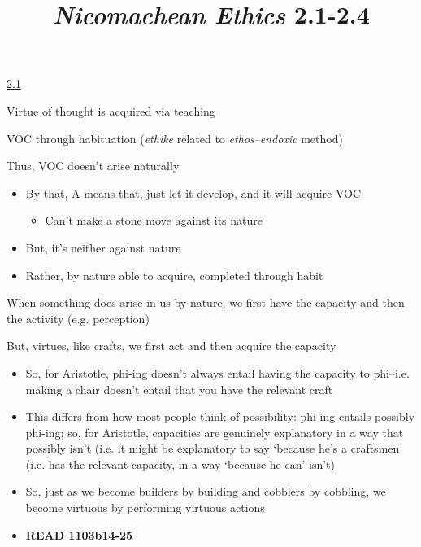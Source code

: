 \documentclass[11pt]{article}
\title{\emph{Nicomachean Ethics} 2.1-2.4}
\author{}
\date{}
\begin{document}
\maketitle

\noindent\underline{2.1}
\vspace*{2mm}

\noindent Virtue of thought is acquired via teaching
\vspace*{2mm}

\noindent VOC through habituation (\emph{ethike} related to \emph{ethos}--\emph{endoxic} method)
\vspace*{2mm}

\noindent Thus, VOC doesn't arise naturally

\begin{itemize}\item{By that, A means that, just let it develop, and it will acquire VOC}\begin{itemize}\item{Can't make a stone move against its nature}\end{itemize}\item{But, it's neither against nature}\item{Rather, by nature able to acquire, completed through habit}\end{itemize}

\noindent When something does arise in us by nature, we first have the capacity and then the activity (e.g. perception)
\vspace*{2mm}

\noindent But, virtues, like crafts, we first act and then acquire the capacity

\begin{itemize}\item{So, for Aristotle, phi-ing doesn't always entail having the capacity to phi--i.e. making a chair doesn't entail that you have the relevant craft}\item{This differs from how most people think of possibility: phi-ing entails possibly phi-ing; so, for Aristotle, capacities are genuinely explanatory in a way that possibly isn't (i.e. it might be explanatory to say `because he's a craftsmen (i.e. has the relevant capacity, in a way `because he can' isn't)}\item{So, just as we become builders by building and cobblers by cobbling, we become virtuous by performing virtuous actions}\item{\textbf{READ 1103b14-25}}\end{itemize}
\end{document}
